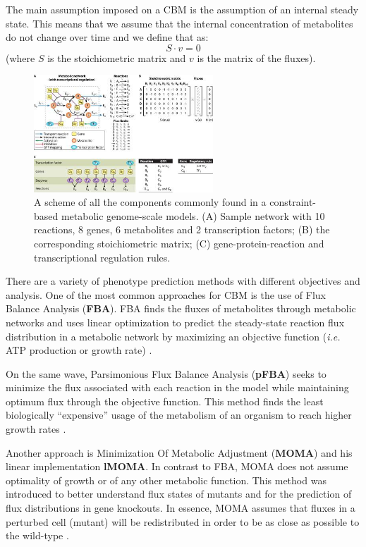 \documentclass[runningheads]{llncs}
\begin{document}
The main assumption imposed on a CBM is the assumption of an internal steady state. This means that we assume that the internal concentration of metabolites do not change over time and we define that as:
\begin{equation} \label{eq:1}
    S \cdot v = 0
\end{equation}
(where \(S\) is the stoichiometric matrix and \(v\) is the matrix of the fluxes).

\begin{figure}[H]
    \centering
    \includegraphics[width=0.60\textwidth]{imagens/stoichiometric_matrix.jpg}
    \caption{A scheme of all the components commonly found in a constraint-based metabolic genome-scale models. (A) Sample network with 10 reactions, 8 genes, 6 metabolites and 2 transcription factors; (B) the corresponding stoichiometric matrix; (C) gene-protein-reaction and transcriptional regulation rules. \cite{maia2016silico}}
    \label{fig:cbmexample}
\end{figure}



There are a variety of phenotype prediction methods with different objectives and analysis. One of the most common approaches for CBM is the use of Flux Balance Analysis (\textbf{FBA}). FBA finds the fluxes of metabolites through metabolic networks and uses linear optimization to predict the steady-state reaction flux distribution in a metabolic network by maximizing an objective function (\emph{i.e.} ATP production or growth rate) \cite{kauffman2003advances,orth2010flux}.

On the same wave, Parsimonious Flux Balance Analysis (\textbf{pFBA}) seeks to minimize the flux associated with each reaction in the model while maintaining optimum flux through the objective function. This method finds the least biologically “expensive” usage of the metabolism of an organism to reach higher growth rates \cite{jenior2020transcriptome}.

Another approach is Minimization Of Metabolic Adjustment (\textbf{MOMA}) and his linear implementation \textbf{lMOMA}. In contrast to FBA, MOMA does not assume optimality of growth or of any other metabolic function. This method was introduced to better understand flux states of mutants and for the prediction of flux distributions in gene knockouts. In essence, MOMA assumes that fluxes in a perturbed cell (mutant) will be redistributed in order to be as close as possible to the wild-type \cite{segre2002analysis}. 
\end{document}
